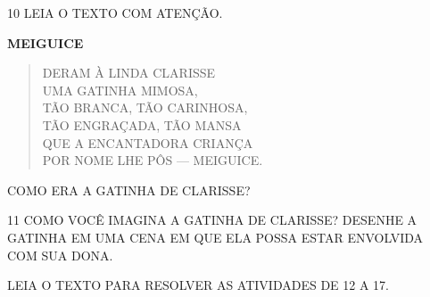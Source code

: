 \num{10} LEIA O TEXTO COM ATENÇÃO.

\begin{myquote}
\textbf{MEIGUICE}\\
\begin{verse}
DERAM À LINDA CLARISSE\\
UMA GATINHA MIMOSA,\\
TÃO BRANCA, TÃO CARINHOSA,\\
TÃO ENGRAÇADA, TÃO MANSA\\
QUE A ENCANTADORA CRIANÇA\\
POR NOME LHE PÔS --- MEIGUICE.
\end{verse}

\end{myquote}

COMO ERA A GATINHA DE CLARISSE?


\num{11} COMO VOCÊ IMAGINA A GATINHA DE CLARISSE? DESENHE A GATINHA EM UMA CENA EM QUE ELA POSSA ESTAR ENVOLVIDA COM SUA DONA.

\begin{mdframed}[linewidth=2pt,linecolor=salmao,roundcorner=2pt]
\vspace{19cm}
\end{mdframed}

LEIA O TEXTO PARA RESOLVER AS ATIVIDADES DE 12 A 17.

